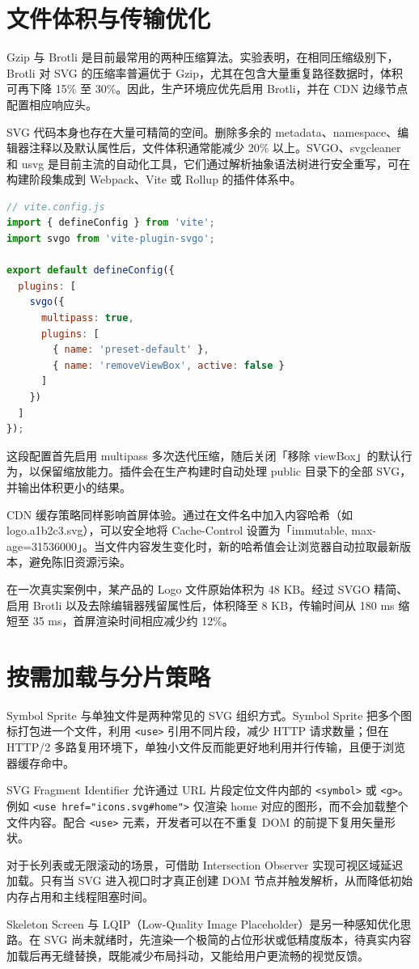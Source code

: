 \section{文件体积与传输优化}
Gzip 与 Brotli 是目前最常用的两种压缩算法。实验表明，在相同压缩级别下，Brotli 对 SVG 的压缩率普遍优于 Gzip，尤其在包含大量重复路径数据时，体积可再下降 15\%{} 至 30\%{}。因此，生产环境应优先启用 Brotli，并在 CDN 边缘节点配置相应响应头。\par
SVG 代码本身也存在大量可精简的空间。删除多余的 metadata、namespace、编辑器注释以及默认属性后，文件体积通常能减少 20\%{} 以上。SVGO、svgcleaner 和 usvg 是目前主流的自动化工具，它们通过解析抽象语法树进行安全重写，可在构建阶段集成到 Webpack、Vite 或 Rollup 的插件体系中。\par
\begin{lstlisting}[language=js]
// vite.config.js
import { defineConfig } from 'vite';
import svgo from 'vite-plugin-svgo';

export default defineConfig({
  plugins: [
    svgo({
      multipass: true,
      plugins: [
        { name: 'preset-default' },
        { name: 'removeViewBox', active: false }
      ]
    })
  ]
});
\end{lstlisting}
这段配置首先启用 multipass 多次迭代压缩，随后关闭「移除 viewBox」的默认行为，以保留缩放能力。插件会在生产构建时自动处理 public 目录下的全部 SVG，并输出体积更小的结果。\par
CDN 缓存策略同样影响首屏体验。通过在文件名中加入内容哈希（如 logo.a1b2c3.svg），可以安全地将 Cache-Control 设置为「immutable, max-age=31536000」。当文件内容发生变化时，新的哈希值会让浏览器自动拉取最新版本，避免陈旧资源污染。\par
在一次真实案例中，某产品的 Logo 文件原始体积为 48 KB。经过 SVGO 精简、启用 Brotli 以及去除编辑器残留属性后，体积降至 8 KB，传输时间从 180 ms 缩短至 35 ms，首屏渲染时间相应减少约 12\%{}。\par
\section{按需加载与分片策略}
Symbol Sprite 与单独文件是两种常见的 SVG 组织方式。Symbol Sprite 把多个图标打包进一个文件，利用 \texttt{<use>} 引用不同片段，减少 HTTP 请求数量；但在 HTTP/2 多路复用环境下，单独小文件反而能更好地利用并行传输，且便于浏览器缓存命中。\par
SVG Fragment Identifier 允许通过 URL 片段定位文件内部的 \texttt{<symbol>} 或 \texttt{<g>}。例如 \texttt{<use href="icons.svg\#{}home">} 仅渲染 home 对应的图形，而不会加载整个文件内容。配合 \texttt{<use>} 元素，开发者可以在不重复 DOM 的前提下复用矢量形状。\par
对于长列表或无限滚动的场景，可借助 Intersection Observer 实现可视区域延迟加载。只有当 SVG 进入视口时才真正创建 DOM 节点并触发解析，从而降低初始内存占用和主线程阻塞时间。\par
Skeleton Screen 与 LQIP（Low-Quality Image Placeholder）是另一种感知优化思路。在 SVG 尚未就绪时，先渲染一个极简的占位形状或低精度版本，待真实内容加载后再无缝替换，既能减少布局抖动，又能给用户更流畅的视觉反馈。\par
